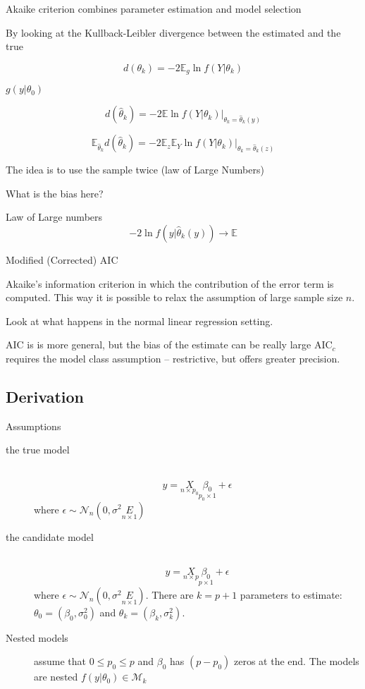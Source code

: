 \documentclass[a4paper]{article}
\newcommand{\brac}[1]{{\left ( #1 \right )}}
\newcommand{\induc}[1]{{\left . #1 \right \vert}}
\newcommand{\Mcal}{\mathcal{M}}
\newcommand{\Ncal}{\mathcal{N}}
\newcommand{\ex}{\mathbb{E}}
\begin{document}
Akaike criterion combines parameter estimation and model selection

By looking at the Kullback-Leibler divergence between the estimated and the true

\[d(\theta_k) = - 2 \ex_g \ln f\brac{\induc{Y}\theta_k}\]

$g(y\vert \theta_0)$

\[d(\hat{\theta}_k) = - 2 \induc{\ex \ln f\brac{\induc{Y}\theta_k}}_{\theta_k = \hat{\theta}_k(y)}\]

\[\ex_{\hat{\theta}_k} d(\hat{\theta}_k) = - 2 \induc{\ex_z \ex_Y \ln f\brac{\induc{Y}\theta_k}}_{\theta_k = \hat{\theta}_k(z)}\]

The idea is to use the sample twice (law of Large Numbers)

What is the bias here?

Law of Large numbers
\[-2 \ln f\brac{\induc{y}\hat{\theta}_k(y)} \to \ex \]

Modified (Corrected) AIC

Akaike's information criterion in which the contribution of the error term is computed.
This way it is possible to relax the assumption of large sample size $n$.

Look at what happens in the normal linear regression setting.

AIC is is more general, but the bias of the estimate can be really large
$\text{AIC}_c$ requires the model class assumption -- restrictive, but offers greater precision.

\subsection{Derivation} %
\label{sub:derivation}
Assumptions \begin{description}
	\item[the true model]\hfill\\
	\[y = \underset{n\times p_0}{X}\underset{p_0\times 1}{\beta_0} + \epsilon\]
	where $\epsilon \sim \Ncal_n\brac{0,\sigma^2 \underset{n\times 1}{E}}$
	\item[the candidate model] \hfill\\
	\[y = \underset{n\times p}{X}\underset{p\times 1}{\beta_0} + \epsilon\]
	where $\epsilon \sim \Ncal_n\brac{0,\sigma^2 \underset{n\times 1}{E}}$.
	There are $k=p+1$ parameters to estimate: $\theta_0 = \brac{\beta_0,\sigma_0^2}$ and $\theta_k = \brac{\beta_k,\sigma_k^2}$.
	\item[Nested models] assume that $0\leq p_0 \leq p$ and $\beta_0$ has $(p-p_0)$ zeros at the end. The models are nested $f\brac{\induc{y}\theta_0}\in \Mcal_k$
\end{description}
\end{document}
